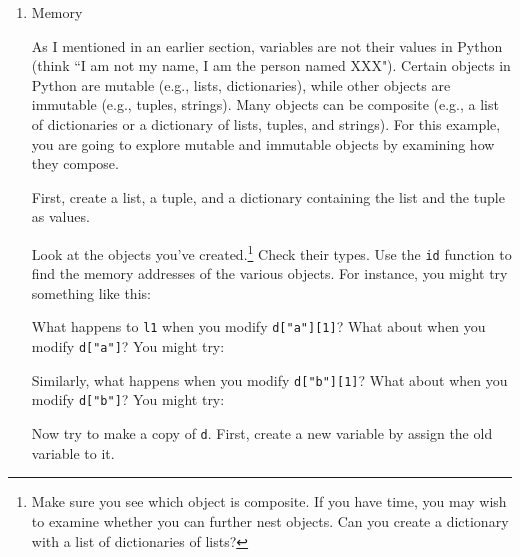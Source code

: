 \documentclass{article}
\begin{document}
\begin{enumerate}
This is an example of how you could use Python to memoize a
function.\footnote{Python 3 provides a decorator to simplify this process: \\*
\url{https://docs.python.org/3/library/functools.html#functools.lru_cache}}
Memoization is a way to speed up a function by caching results once they've
been computed, so that you don't have to compute them again.  Can you think of
cases where this would be useful?

\item Memory

As I mentioned in an earlier section, variables are not their values in Python
(think ``I am not my name, I am the person named XXX").  Certain objects in
Python are mutable (e.g., lists, dictionaries), while other objects are
immutable (e.g., tuples, strings).  Many objects can be composite (e.g., a list
of dictionaries or a dictionary of lists, tuples, and strings).  For this
example, you are going to explore mutable and immutable objects by examining
how they compose.

First, create a list, a tuple, and a dictionary containing the list and the
tuple as values.


Look at the objects you've created.\footnote{Make sure you see which object is
composite.  If you have time, you may wish to examine whether you can further
nest objects.  Can you create a dictionary with a list of dictionaries of
lists?}  Check their types.  Use the \texttt{id} function to find the memory
addresses of the various objects.  For instance, you might try something like
this:


What happens to \texttt{l1} when you modify \texttt{d["a"][1]}?  What about
when you modify \texttt{d["a"]}?  You might try:


Similarly, what happens when you modify \texttt{d["b"][1]}? What about when you
modify \texttt{d["b"]}?  You might try:


Now try to make a copy of \texttt{d}.  First, create a new variable by assign
the old variable to it.



\end{enumerate}
\end{document}
